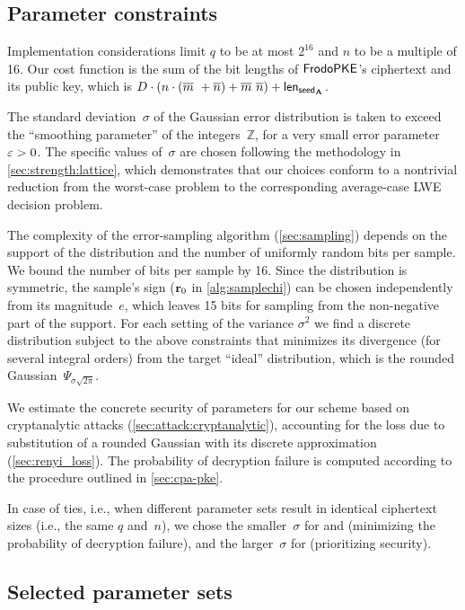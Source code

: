 \documentclass{iacrcc}
\begin{document}
\subsection{Parameter constraints}\label{sec:constraints}

Implementation considerations limit $q$ to be at most $2^{16}$ and $n$
to be a multiple of 16. Our cost function is the sum of the bit lengths of
$\textsf{\upshape\mdseries FrodoPKE}$'s ciphertext and its public key, which is $D\cdot (n\cdot (\overline{m}\ + \overline{n})+\overline{m}\ \overline{n})+{\mathsf{len}_{{\mathsf{seed}_{\mathbf{A}}}}}$.

The standard deviation~$\sigma$ of the Gaussian error distribution is
taken to exceed the ``smoothing parameter'' of the
integers~$\mathbb{Z}$, for a very small error parameter $\varepsilon >
0$. The specific values of~$\sigma$ are chosen following the
methodology in \autoref{sec:strength:lattice}, which demonstrates that
our choices conform to a nontrivial reduction from the worst-case
\BDDwDGS problem to the corresponding average-case LWE decision
problem.

The complexity of the error-sampling algorithm
(\autoref{sec:sampling}) depends on the support of the distribution
and the number of uniformly random bits per sample. We bound the
number of bits per sample by 16. Since the distribution is symmetric,
the sample's sign ($\mathbf{r}_0$ in \autoref{alg:samplechi}) can be chosen
independently from its magnitude~$e$, which leaves 15 bits for
sampling from the non-negative part of the support. For each setting
of the variance $\sigma^2$ we find a discrete distribution subject to
the above constraints that minimizes its \renyi divergence (for
several integral orders) from the target ``ideal'' distribution, which
is the rounded Gaussian~$\Psi_{\sigma \sqrt{2\pi}}$.

We estimate the concrete security of parameters for our scheme based
on cryptanalytic attacks (\autoref{sec:attack:cryptanalytic}),
accounting for the loss due to substitution of a rounded Gaussian with
its discrete approximation (\autoref{sec:renyi_loss}).  The
probability of decryption failure is computed according to the
procedure outlined in \autoref{sec:cpa-pke}.

In case of ties, i.e., when different parameter sets result in
identical ciphertext sizes (i.e., the same $q$ and~$n$), we chose the
smaller~$\sigma$ for \FrodoKEMLOne and \FrodoKEMLFive (minimizing the probability of
decryption failure), and the larger~$\sigma$ for \FrodoKEMLThree
(prioritizing security).

\subsection{Selected parameter sets}\label{sec:params:sets}
\end{document}
